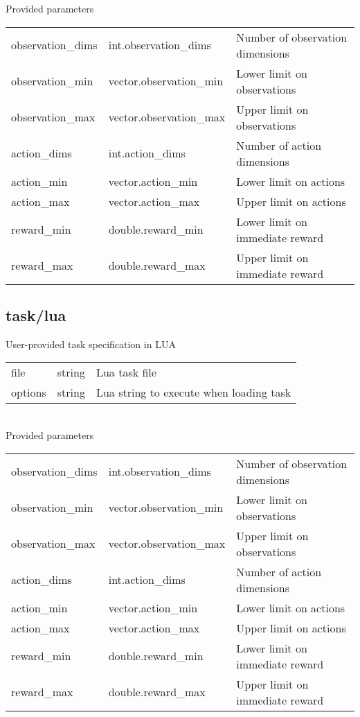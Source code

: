 \noindent Provided parameters\\

\noindent\begin{tabular}{@{}lll@{}}
observation\_dims&int.observation\_dims&Number of observation dimensions\\
observation\_min&vector.observation\_min&Lower limit on observations\\
observation\_max&vector.observation\_max&Upper limit on observations\\
action\_dims&int.action\_dims&Number of action dimensions\\
action\_min&vector.action\_min&Lower limit on actions\\
action\_max&vector.action\_max&Upper limit on actions\\
reward\_min&double.reward\_min&Lower limit on immediate reward\\
reward\_max&double.reward\_max&Upper limit on immediate reward\\
\end{tabular}
\subsection{task/lua}
\noindent User-provided task specification in LUA\\

\noindent\begin{tabular}{@{}lll@{}}
file&string&Lua task file\\
options&string&Lua string to execute when loading task\\
\end{tabular}
\\

\noindent Provided parameters\\

\noindent\begin{tabular}{@{}lll@{}}
observation\_dims&int.observation\_dims&Number of observation dimensions\\
observation\_min&vector.observation\_min&Lower limit on observations\\
observation\_max&vector.observation\_max&Upper limit on observations\\
action\_dims&int.action\_dims&Number of action dimensions\\
action\_min&vector.action\_min&Lower limit on actions\\
action\_max&vector.action\_max&Upper limit on actions\\
reward\_min&double.reward\_min&Lower limit on immediate reward\\
reward\_max&double.reward\_max&Upper limit on immediate reward\\
\end{tabular}
